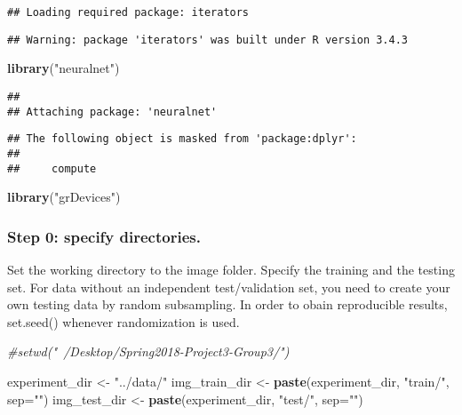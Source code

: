 \documentclass[]{article}
\newenvironment{Shaded}{\begin{snugshade}}{\end{snugshade}}
\newcommand{\KeywordTok}[1]{\textcolor[rgb]{0.13,0.29,0.53}{\textbf{#1}}}
\newcommand{\DataTypeTok}[1]{\textcolor[rgb]{0.13,0.29,0.53}{#1}}
\newcommand{\StringTok}[1]{\textcolor[rgb]{0.31,0.60,0.02}{#1}}
\newcommand{\CommentTok}[1]{\textcolor[rgb]{0.56,0.35,0.01}{\textit{#1}}}
\newcommand{\NormalTok}[1]{#1}
\begin{document}
\begin{verbatim}
## Loading required package: iterators
\end{verbatim}

\begin{verbatim}
## Warning: package 'iterators' was built under R version 3.4.3
\end{verbatim}

\begin{Shaded}
\begin{Highlighting}[]
\KeywordTok{library}\NormalTok{(}\StringTok{"neuralnet"}\NormalTok{)}
\end{Highlighting}
\end{Shaded}

\begin{verbatim}
## 
## Attaching package: 'neuralnet'
\end{verbatim}

\begin{verbatim}
## The following object is masked from 'package:dplyr':
## 
##     compute
\end{verbatim}

\begin{Shaded}
\begin{Highlighting}[]
\KeywordTok{library}\NormalTok{(}\StringTok{"grDevices"}\NormalTok{)}
\end{Highlighting}
\end{Shaded}

\subsubsection{Step 0: specify
directories.}\label{step-0-specify-directories.}

Set the working directory to the image folder. Specify the training and
the testing set. For data without an independent test/validation set,
you need to create your own testing data by random subsampling. In order
to obain reproducible results, set.seed() whenever randomization is
used.

\begin{Shaded}
\begin{Highlighting}[]
\CommentTok{#setwd("~/Desktop/Spring2018-Project3-Group3/")}
\end{Highlighting}
\end{Shaded}

\begin{Shaded}
\begin{Highlighting}[]
\NormalTok{experiment_dir <-}\StringTok{ "../data/"}
\NormalTok{img_train_dir <-}\StringTok{ }\KeywordTok{paste}\NormalTok{(experiment_dir, }\StringTok{"train/"}\NormalTok{, }\DataTypeTok{sep=}\StringTok{""}\NormalTok{)}
\NormalTok{img_test_dir <-}\StringTok{ }\KeywordTok{paste}\NormalTok{(experiment_dir, }\StringTok{"test/"}\NormalTok{, }\DataTypeTok{sep=}\StringTok{""}\NormalTok{)}
\end{Highlighting}
\end{Shaded}
\end{document}

